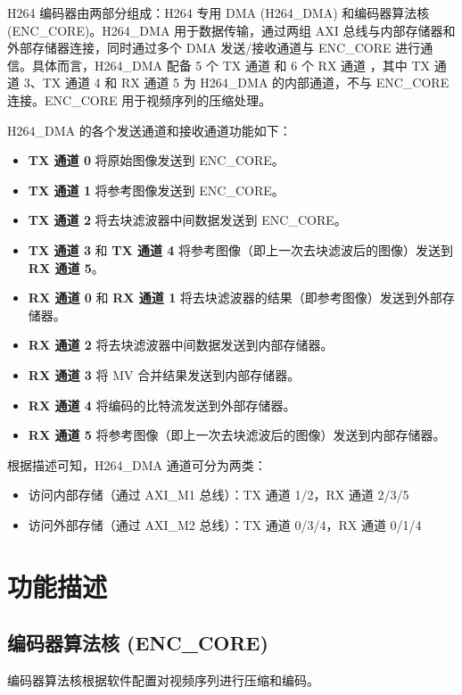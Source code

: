 \documentclass[main\_\_CN.tex]{subfiles}
\begin{document}
H264 编码器由两部分组成：H264 专用 DMA (H264\_DMA) 和编码器算法核 (ENC\_CORE)。H264\_DMA 用于数据传输，通过两组 AXI 总线与内部存储器和外部存储器连接，同时通过多个 DMA 发送/接收通道与 ENC\_CORE 进行通信。具体而言，H264\_DMA 配备 5 个 TX 通道  和 6 个 RX 通道 ，其中 TX 通道 3、TX 通道 4 和 RX 通道 5 为 H264\_DMA 的内部通道，不与 ENC\_CORE 连接。ENC\_CORE 用于视频序列的压缩处理。

H264\_DMA 的各个发送通道和接收通道功能如下：
\begin{itemize}
\item \textbf{TX 通道 0} 将原始图像发送到 ENC\_CORE。
\item \textbf{TX 通道 1} 将参考图像发送到 ENC\_CORE。
\item \textbf{TX 通道 2} 将去块滤波器中间数据发送到 ENC\_CORE。
\item \textbf{TX 通道 3} 和 \textbf{TX 通道 4} 将参考图像（即上一次去块滤波后的图像）发送到 \textbf{RX 通道 5}。
\item \textbf{RX 通道 0} 和 \textbf{RX 通道 1} 将去块滤波器的结果（即参考图像）发送到外部存储器。
\item \textbf{RX 通道 2} 将去块滤波器中间数据发送到内部存储器。
\item \textbf{RX 通道 3} 将 MV 合并结果发送到内部存储器。
\item \textbf{RX 通道 4} 将编码的比特流发送到外部存储器。
\item \textbf{RX 通道 5} 将参考图像（即上一次去块滤波后的图像）发送到内部存储器。
\end{itemize}


根据描述可知，H264\_DMA 通道可分为两类：

\begin{itemize}
\item 访问内部存储（通过 AXI\_M1 总线）：TX 通道 1/2，RX 通道 2/3/5
\item 访问外部存储（通过 AXI\_M2 总线）：TX 通道 0/3/4，RX 通道 0/1/4
\end{itemize}


\section{功能描述}
\label{sec:h264enc-func-descr}

\subsection{编码器算法核 (ENC\_CORE)}\label{sec:h264-core}
编码器算法核根据软件配置对视频序列进行压缩和编码。
\end{document}
